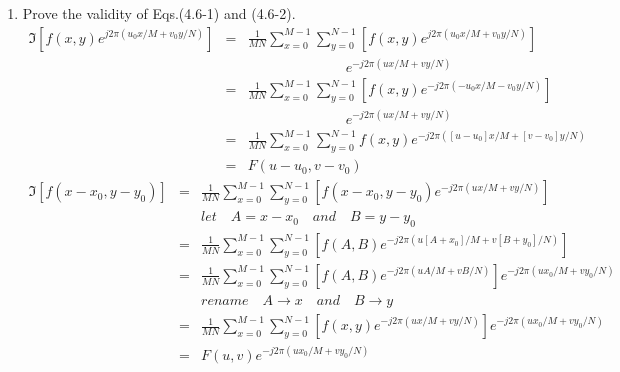 \documentclass[10pt,letterpaper,oneside,onecolumn,leqno,fleqn]{article}
\begin{document}
\begin{enumerate}
\begin{enumerate}
        \bigskip \bigskip
        \item
          Prove the validity of Eqs.(4.6-1) and (4.6-2).
          \begin{eqnarray*}
            \Im\left[f(x,y)e^{j2\pi(u_0x/M+v_0y/N)}\right]
            &=& \frac{1}{MN} \sum_{x=0}^{M-1} \sum_{y=0}^{N-1} \left[
                f(x,y)e^{j2\pi(u_0x/M+v_0y/N)} \right] \\
            &&  \qquad \qquad \qquad \quad e^{-j2\pi(ux/M+vy/N)} \\
            &=& \frac{1}{MN} \sum_{x=0}^{M-1} \sum_{y=0}^{N-1} \left[ f(x,y)
                e^{-j2\pi(-u_0x/M-v_0y/N)} \right] \\
            &&  \qquad \qquad \qquad \quad e^{-j2\pi(ux/M+vy/N)} \\
            &=& \frac{1}{MN} \sum_{x=0}^{M-1} \sum_{y=0}^{N-1} f(x,y)
                e^{-j2\pi([u-u_0]x/M+[v-v_0]y/N)} \\
            &=& F(u-u_0, v-v_0)
          \end{eqnarray*}
          \begin{eqnarray*}
            \Im\left[f(x-x_0, y-y_0)\right]
            &=& \frac{1}{MN} \sum_{x=0}^{M-1} \sum_{y=0}^{N-1} \left[
                f(x-x_0,y-y_0)e^{-j2\pi(ux/M+vy/N)} \right] \\
            &&  let \quad A = x-x_0 \quad and \quad B = y - y_0 \\
            &=& \frac{1}{MN} \sum_{x=0}^{M-1} \sum_{y=0}^{N-1} \left[
                f(A,B) e^{-j2\pi(u[A+x_0]/M+v[B+y_0]/N)} \right] \\
            &=& \frac{1}{MN} \sum_{x=0}^{M-1} \sum_{y=0}^{N-1} \left[
                f(A,B) e^{-j2\pi(uA/M+vB/N)} \right]
                e^{-j2\pi(ux_0/M+vy_0/N)} \\
            &&  rename \quad A \to x \quad and \quad B \to y \\
            &=& \frac{1}{MN} \sum_{x=0}^{M-1} \sum_{y=0}^{N-1} \left[
                f(x,y) e^{-j2\pi(ux/M+vy/N)} \right]
                e^{-j2\pi(ux_0/M+vy_0/N)} \\
            &=& F(u,v) e^{-j2\pi(ux_0/M+vy_0/N)}
          \end{eqnarray*}
    \end{enumerate}
  \end{enumerate}
\end{document}
